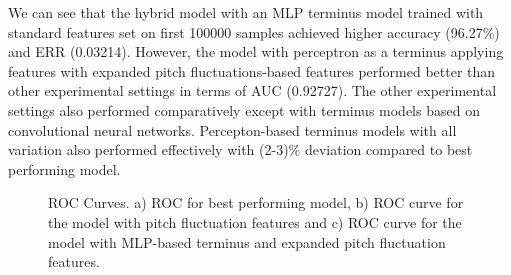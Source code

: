 \documentclass{article}
\begin{document}
We can see that the hybrid model with an MLP terminus model trained with standard features set on first 100000 samples achieved higher accuracy (96.27\%) and ERR (0.03214). However, the model with perceptron as a terminus applying features with expanded pitch fluctuations-based features performed better than other experimental settings in terms of AUC (0.92727). The other experimental settings also performed comparatively except with terminus models based on convolutional neural networks. Percepton-based terminus models with all variation also performed effectively with (2-3)\% deviation compared to best performing model.


\begin{figure}
    \centering
    \caption{ROC Curves. a) ROC for best performing model, b) ROC curve for the model with pitch fluctuation features and c) ROC curve for the model with MLP-based terminus and expanded pitch fluctuation features.}
    \label{ROC_curves}
\end{figure}

\end{document}

